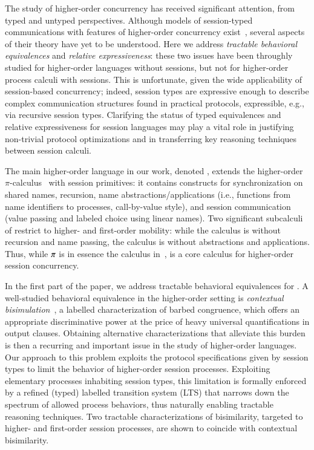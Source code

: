 The study of higher-order concurrency has received significant attention, 
from typed and untyped perspectives.
Although models of session-typed 
communications with features of higher-order concurrency exist~\cite{tlca07,DBLP:journals/jfp/GayV10},
several aspects of their theory 
have yet to be understood. Here we address
 \emph{tractable behavioral equivalences} and \emph{relative expressiveness}:
these two issues 
have been throughly studied
for higher-order languages without sessions,
but not for higher-order process calculi with sessions.
This is unfortunate, given the wide applicability of session-based concurrency; indeed,
session types are expressive enough to describe complex 
communication structures found in practical protocols,  expressible, e.g., via recursive session types.
Clarifying the status of typed equivalences and relative expressiveness for session languages
may play a vital role in justifying non-trivial protocol optimizations and in transferring key reasoning techniques between session calculi.

The main higher-order language in our work, denoted \HOp,
extends the higher-order $\pi$-calculus~\cite{SangiorgiD:expmpa} with session primitives:
it contains constructs for 
synchronization on shared names, 
recursion, 
name abstractions/applications (i.e., functions from name identifiers to processes, call-by-value style),
and session communication (value passing and
labeled choice using linear names). 
Two significant subcalculi of \HOp restrict to higher- and first-order mobility:
while the \HO calculus is \HOp without recursion and name passing,
the \sessp calculus is \HOp without abstractions and applications.
Thus, 
while $\pi$ is in essence the calculus in~\cite{honda.vasconcelos.kubo:language-primitives}, 
\HO  is  a core calculus for higher-order session concurrency.

In the first part of the paper, we address tractable behavioral equivalences
for \HOp.
A well-studied behavioral equivalence in the higher-order setting 
is \emph{contextual bisimulation}~\cite{San96H},
a labelled characterization of barbed congruence, 
which offers an appropriate discriminative power at the price of heavy universal quantifications in output clauses.
Obtaining alternative characterizations that alleviate this burden
is then a recurring and important issue 
in the study of higher-order languages.
Our approach to this problem 
exploits the protocol specifications given by session types to  limit 
the behavior of higher-order session processes. 
Exploiting elementary processes inhabiting session types, 
this limitation is formally enforced by 
a refined (typed) labelled transition system (LTS)
that narrows down the spectrum of allowed process behaviors, 
thus naturally enabling tractable reasoning techniques. 
Two tractable characterizations of bisimilarity, 
targeted to higher- and first-order session processes,
are shown to coincide with contextual bisimilarity.


